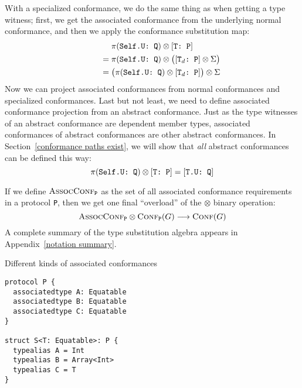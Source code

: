 \documentclass[../generics]{subfiles}
\begin{document}
With a specialized conformance, we do the same thing as when getting a type witness; first, we get the associated conformance from the underlying normal conformance, and then we apply the conformance substitution map:
\begin{gather*}
\pi(\texttt{Self.U:~Q})\otimes[\texttt{T:~P}]\\
\qquad {} = \pi(\texttt{Self.U:~Q})\otimes\bigl([\texttt{$\texttt{T}_d$:~P}]\otimes\Sigma\bigr)\\
\qquad {} = \bigl(\pi(\texttt{Self.U:~Q})\otimes[\texttt{$\texttt{T}_d$:~P}]\bigr)\otimes\Sigma
\end{gather*}
Now we can project associated conformances from normal conformances and specialized conformances. Last but not least, we need to define associated conformance projection from an abstract conformance. Just as the type witnesses of an abstract conformance are dependent member types, associated conformances of abstract conformances are other abstract conformances. In Section~\ref{conformance paths exist}, we will show that \emph{all} abstract conformances can be defined this way:
\[
\pi(\texttt{Self.U:~Q}) \otimes [\texttt{T:~P}] = [\texttt{T.U:~Q}]
\]

If we define $\textsc{AssocConf}_{\texttt{P}}$ as the set of all associated conformance requirements in a protocol \texttt{P}, then we get one final ``overload'' of the \index{$\otimes$}$\otimes$ binary operation:
\[\textsc{AssocConf}_{\texttt{P}}\otimes\textsc{Conf}_{\texttt{P}}({G})\longrightarrow\textsc{Conf}({G})\]
A complete summary of the type substitution algebra appears in Appendix~\ref{notation summary}.

\begin{listing}\caption{Different kinds of associated conformances}\label{associated conformance example}
\begin{Verbatim}
protocol P {
  associatedtype A: Equatable
  associatedtype B: Equatable
  associatedtype C: Equatable
}

struct S<T: Equatable>: P {
  typealias A = Int
  typealias B = Array<Int>
  typealias C = T
}
\end{Verbatim}
\end{listing}
\end{document}
